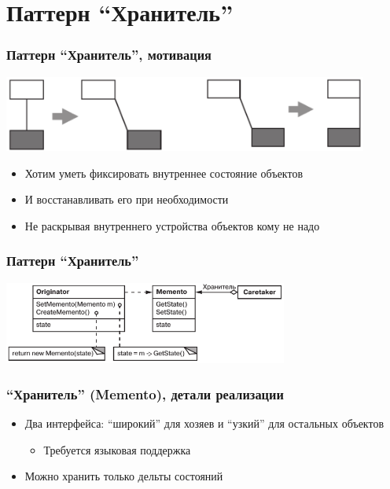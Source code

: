 \documentclass{../../slides-style}
\begin{document}
    \section{Паттерн ``Хранитель''}

    \begin{frame}
        \frametitle{Паттерн ``Хранитель'', мотивация}
        \begin{center}
            \includegraphics[width=0.9\textwidth]{mementoMotivation.png}
        \end{center}
        \begin{itemize}
            \item Хотим уметь фиксировать внутреннее состояние объектов
            \item И восстанавливать его при необходимости
            \item Не раскрывая внутреннего устройства объектов кому не надо
        \end{itemize}
    \end{frame}

    \begin{frame}
        \frametitle{Паттерн ``Хранитель''}
        \begin{center}
            \includegraphics[width=0.7\textwidth]{memento.png}
        \end{center}
    \end{frame}

    \begin{frame}
        \frametitle{``Хранитель'' (Memento), детали реализации}
        \begin{itemize}
            \item Два интерфейса: ``широкий'' для хозяев и ``узкий'' для остальных объектов
            \begin{itemize}
                \item Требуется языковая поддержка
            \end{itemize}
            \item Можно хранить только дельты состояний
        \end{itemize}
    \end{frame}
\end{document}
